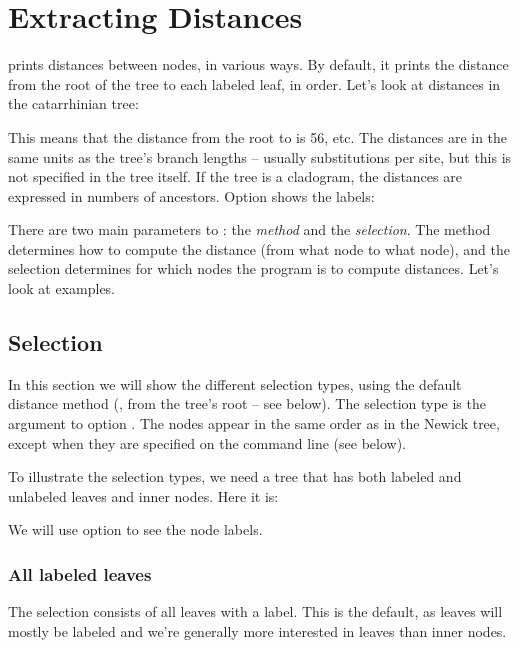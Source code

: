 \section[sct:distance]{Extracting Distances}

\distance{} prints distances between nodes, in various ways.  By default, it
prints the distance from the root of the tree to each labeled leaf, in \nw{}
order. Let's look at distances in the catarrhinian tree:



\noindent{}This means that the distance from the root to  is
56, etc. The distances are in the same units as the tree's branch lengths --
usually substitutions per site, but this is not specified in the tree itself.
If the tree is a cladogram, the distances are expressed in numbers of
ancestors.  Option  shows the labels:


There are two main parameters to \distance: the {\em method} and the
{\em selection}. The method determines how to compute the distance (from what
node to what node), and the selection determines for which nodes the program is
to compute distances. Let's look at examples.

\subsection{Selection}

In this section we will show the different selection types, using the default
distance method (\ie{}, from the tree's root -- see below). The selection type
is the argument to option .  The nodes appear in the same order as
in the Newick tree, except when they are specified on the command line (see
below).

To illustrate the selection types, we need a tree that has both labeled and
unlabeled leaves and inner nodes. Here it is:


We will use option  to see the node labels.

\subsubsection{All labeled leaves}

The selection consists of all leaves with a label. This is the default, as
leaves will mostly be labeled and we're generally more interested in leaves
than inner nodes.

